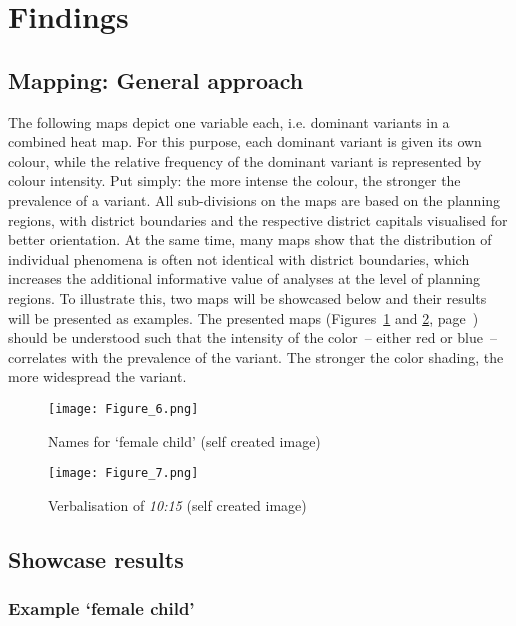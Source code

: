 \documentclass[output=paper,colorlinks, citecolor=brown]{langscibook}
\begin{document}
\section{Findings} \label{sec:blaßnigg:3}
\subsection{Mapping: General approach} \label{sec:blaßnigg:3.1}

The following maps depict one variable each, i.e. dominant variants in a combined heat map. For this purpose, each dominant variant is given its own colour, while the relative frequency of the dominant variant is represented by colour intensity. Put simply: the more intense the colour, the stronger the prevalence of a variant. All sub-divisions on the maps are based on the planning regions, with district boundaries and the respective district capitals visualised for better orientation. At the same time, many maps show that the distribution of individual phenomena is often not identical with district boundaries, which increases the additional informative value of analyses at the level of planning regions. To illustrate this, two maps will be showcased below and their results will be presented as examples. The presented maps (Figures~\ref{fig:blaßnigg:6} and \ref{fig:blaßnigg:7}, page~\pageref{fig:blaßnigg:6}) should be understood such that the intensity of the color~-- either red or blue~-- correlates with the prevalence of the variant. The stronger the color shading, the more widespread the variant.

\begin{figure}[p]
\texttt{[image: Figure\_6.png]}
\caption{Names for `female child' (self created image)} \label{fig:blaßnigg:6}
\end{figure}

  
\begin{figure}[p]
\texttt{[image: Figure\_7.png]}
\caption{Verbalisation of \textit{10:15} (self created image)} \label{fig:blaßnigg:7}
\end{figure}

\subsection{Showcase results} \label{sec:blaßnigg:3.2}
\subsubsection{Example `female child'} \label{sec:blaßnigg:3.2.1}
\end{document}
